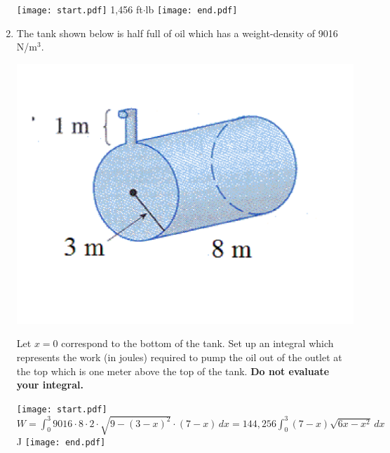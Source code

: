 \documentclass[12pt]{article}
\begin{document}
\begin{enumerate}
\texttt{[image: start.pdf]}
{{1,456 ft$\cdot$lb}}
\texttt{[image: end.pdf]}


\item The tank shown below is half full of oil which has a weight-density of 9016 N/m$^3$.  
\begin{center}
\includegraphics[scale=0.3]{tank.pdf}
\end{center}
Let $x=0$ correspond to the bottom of the tank.  Set up an integral which represents the work (in joules) required to pump the oil out of the outlet at the top which is one meter above the top of the tank.  {\bf Do not evaluate your integral.}

\texttt{[image: start.pdf]}
{{$W=\int_0^3 9016 \cdot 8 \cdot 2 \cdot \sqrt{9-(3-x)^2} \cdot (7-x) \,dx= 144,256 \int_0^3 (7-x)\sqrt{6x-x^2}\,dx$ J}}
\texttt{[image: end.pdf]}


\end{enumerate}
\end{document}

